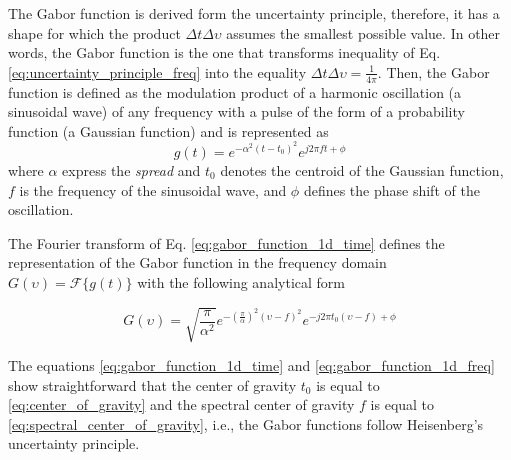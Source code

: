 The Gabor function is derived form the uncertainty principle, therefore, it has a shape for which the product $\Delta t \Delta \upsilon$ assumes the smallest possible value. In other words, the Gabor function is the one that transforms inequality of Eq. \eqref{eq:uncertainty_principle_freq} into the equality $\Delta t \Delta \upsilon = \frac{1}{4 \pi}$. Then, the Gabor function is defined as the modulation product of a harmonic oscillation (a sinusoidal wave) of any frequency with a pulse of the form of a probability function (a Gaussian function) \citep{Gabor:JIEE:1946} and is represented as
\begin{equation}\label{eq:gabor_function_1d_time}
    g(t) =  e ^{-\alpha^2(t-t_0)^2} e ^{j 2 \pi f t + \phi}
\end{equation}
where $\alpha$ express the \textit{spread} and $t_0$ denotes the centroid of the Gaussian function, $f$ is the frequency of the sinusoidal wave, and $\phi$ defines the phase shift of the oscillation.

The Fourier transform of Eq. \eqref{eq:gabor_function_1d_time} defines the representation of the Gabor function in the frequency domain $G(\upsilon) = \mathcal{F}\{g(t)\}$ with the following analytical form

\begin{equation}\label{eq:gabor_function_1d_freq}
    G(\upsilon) =  \sqrt{\frac{\pi}{\alpha^2}} e ^{-\left(\frac{\pi}{\alpha}\right) ^{2} (\upsilon-f)^2} e ^{-j 2 \pi t_0 (\upsilon-f) + \phi}
\end{equation}

The equations \eqref{eq:gabor_function_1d_time} and \eqref{eq:gabor_function_1d_freq} show straightforward that the center of gravity $t_0$ is equal to \eqref{eq:center_of_gravity} and the spectral center of gravity $f$ is equal to \eqref{eq:spectral_center_of_gravity}, i.e., the Gabor functions follow Heisenberg's uncertainty principle.   

